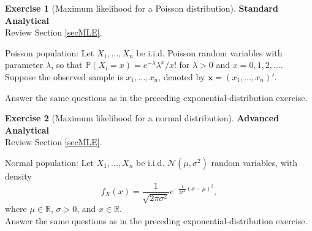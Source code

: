 \documentclass[
  11pt,
]{book}
\theoremstyle{definition}
\theoremstyle{definition}
\theoremstyle{definition}
\newtheorem{exercise}{Exercise}[chapter]
\theoremstyle{definition}
\theoremstyle{remark}
\begin{document}

\begin{exercisebox}

\begin{exercise}[Maximum likelihood for a Poisson distribution]
\protect\hypertarget{exr:estimation-mle-poisson}{}\label{exr:estimation-mle-poisson}\textbf{Standard \textbar{} Analytical}\\
Review Section \ref{secMLE}.

Poisson population: Let \(X_1,\dots,X_n\) be i.i.d. Poisson random variables with parameter \(\lambda\), so that \(\mathbb{P}(X_i=x)=e^{-\lambda}\lambda^x/x!\) for \(\lambda>0\) and \(x=0,1,2,\dots\). Suppose the observed sample is \(x_1,\dots,x_n\), denoted by \(\mathbf{x}=(x_1,\dots,x_n)'\).

Answer the same questions as in the preceding exponential-distribution exercise.
\end{exercise}

\end{exercisebox}


\begin{exercisebox}

\begin{exercise}[Maximum likelihood for a normal distribution]
\protect\hypertarget{exr:estimation-mle-normal}{}\label{exr:estimation-mle-normal}\textbf{Advanced \textbar{} Analytical}\\
Review Section \ref{secMLE}.

Normal population: Let \(X_1,\dots,X_n\) be i.i.d. \(\mathcal{N}(\mu,\sigma^2)\) random variables, with density \[f_X(x) = \frac{1}{\sqrt{2\pi\sigma^2}} e^{-\frac{1}{2\sigma^2} (x - \mu)^2},\] where \(\mu \in \mathbb{R}\), \(\sigma > 0\), and \(x \in \mathbb{R}\).\\
Answer the same questions as in the preceding exponential-distribution exercise.
\end{exercise}

\end{exercisebox}

\end{document}
